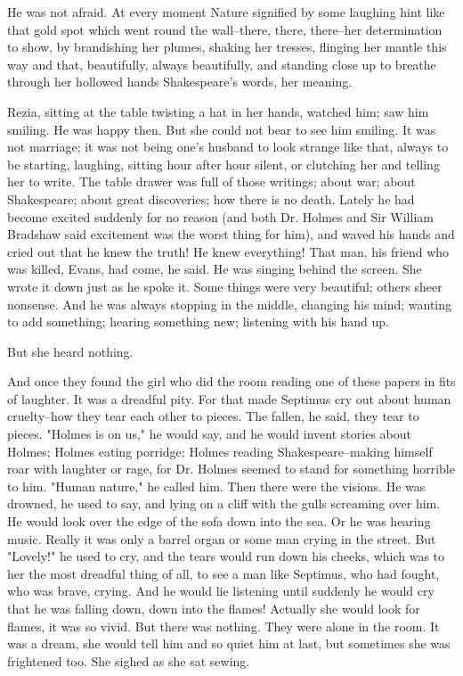 \documentclass[lang=cn,10pt]{elegantbook}
\begin{document}
He was not afraid.  At every moment Nature signified by some
laughing hint like that gold spot which went round the wall--there,
there, there--her determination to show, by brandishing her plumes,
shaking her tresses, flinging her mantle this way and that,
beautifully, always beautifully, and standing close up to breathe
through her hollowed hands Shakespeare's words, her meaning.

Rezia, sitting at the table twisting a hat in her hands, watched
him; saw him smiling.  He was happy then.  But she could not bear
to see him smiling.  It was not marriage; it was not being one's
husband to look strange like that, always to be starting, laughing,
sitting hour after hour silent, or clutching her and telling her to
write.  The table drawer was full of those writings; about war;
about Shakespeare; about great discoveries; how there is no death.
Lately he had become excited suddenly for no reason (and both Dr.
Holmes and Sir William Bradshaw said excitement was the worst thing
for him), and waved his hands and cried out that he knew the truth!
He knew everything!  That man, his friend who was killed, Evans,
had come, he said.  He was singing behind the screen.  She wrote it
down just as he spoke it.  Some things were very beautiful; others
sheer nonsense.  And he was always stopping in the middle, changing
his mind; wanting to add something; hearing something new;
listening with his hand up.

But she heard nothing.

And once they found the girl who did the room reading one of these
papers in fits of laughter.  It was a dreadful pity.  For that made
Septimus cry out about human cruelty--how they tear each other to
pieces.  The fallen, he said, they tear to pieces.  "Holmes is on
us," he would say, and he would invent stories about Holmes; Holmes
eating porridge; Holmes reading Shakespeare--making himself roar
with laughter or rage, for Dr. Holmes seemed to stand for something
horrible to him.  "Human nature," he called him.  Then there were
the visions.  He was drowned, he used to say, and lying on a cliff
with the gulls screaming over him.  He would look over the edge of
the sofa down into the sea.  Or he was hearing music.  Really it
was only a barrel organ or some man crying in the street.  But
"Lovely!" he used to cry, and the tears would run down his cheeks,
which was to her the most dreadful thing of all, to see a man like
Septimus, who had fought, who was brave, crying.  And he would lie
listening until suddenly he would cry that he was falling down,
down into the flames!  Actually she would look for flames, it was
so vivid.  But there was nothing.  They were alone in the room.  It
was a dream, she would tell him and so quiet him at last, but
sometimes she was frightened too.  She sighed as she sat sewing.
\end{document}

